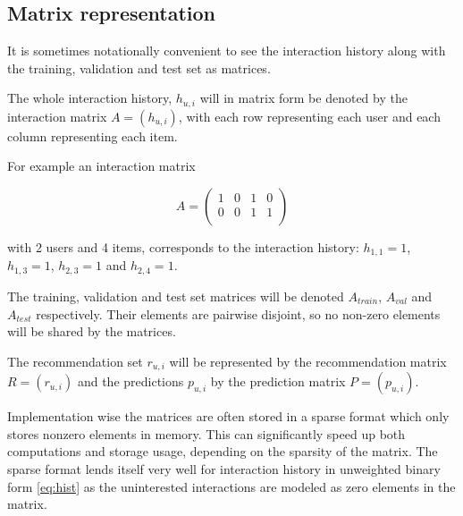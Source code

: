 
\subsection{Matrix representation}\label{sec:background:theory:matrix}

It is sometimes notationally convenient to see the interaction history along with the training, validation and test set as matrices.

The whole interaction history, $h_{u, i}$ will in matrix form be denoted by the interaction matrix $A = (h_{u, i})$, with each row representing each user and each column representing each item.

For example an interaction matrix

\begin{equation}
    A =
    \begin{pmatrix}
        1 & 0 & 1 & 0 \\
        0 & 0 & 1 & 1 \\
    \end{pmatrix}
\end{equation}

with 2 users and 4 items, corresponds to the interaction history: $h_{1, 1} = 1$, $h_{1, 3} = 1$, $h_{2, 3} = 1$ and $h_{2, 4} = 1$.

The training, validation and test set matrices will be denoted $A_{train}$, $A_{val}$ and $A_{test}$ respectively. Their elements are pairwise disjoint, so no non-zero elements will be shared by the matrices.

The recommendation set $r_{u, i}$ will be represented by the recommendation matrix $R = (r_{u, i})$ and the predictions $p_{u, i}$ by the prediction matrix $P = (p_{u, i})$.

Implementation wise the matrices are often stored in a sparse format which only stores nonzero elements in memory. This can significantly speed up both computations and storage usage, depending on the sparsity of the matrix. The sparse format lends itself very well for interaction history in unweighted binary form \eqref{eq:hist} as the uninterested interactions are modeled as zero elements in the matrix.

